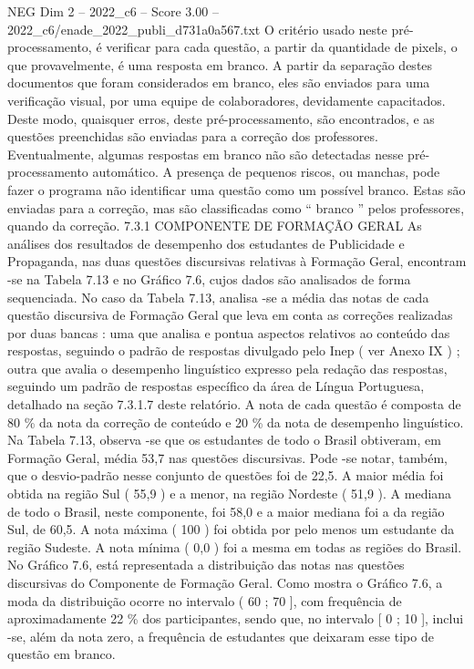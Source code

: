 \begin{textsample}{NEG Dim 2 – 2022\_c6 – Score 3.00 – 2022\_c6/enade\_2022\_publi\_d731a0a567.txt}
O critério usado neste pré-processamento, é verificar para cada questão, a partir da quantidade de pixels, o que provavelmente, é uma resposta em branco.
A partir da separação destes documentos que foram considerados em branco, eles são enviados para uma verificação visual, por uma equipe de colaboradores, devidamente capacitados.
Deste modo, quaisquer erros, deste pré-processamento, são encontrados, e as questões preenchidas são enviadas para a correção dos professores.
Eventualmente, algumas respostas em branco não são detectadas nesse pré-processamento automático.
A presença de pequenos riscos, ou manchas, pode fazer o programa não identificar uma questão como um possível branco.
Estas são enviadas para a correção, mas são classificadas como “ branco ” pelos professores, quando da correção. 7.3.1 COMPONENTE DE FORMAÇÃO GERAL As análises dos resultados de desempenho dos estudantes de Publicidade e Propaganda, nas duas questões discursivas relativas à Formação Geral, encontram -se na Tabela 7.13 e no Gráfico 7.6, cujos dados são analisados de forma sequenciada.
No caso da Tabela 7.13, analisa -se a média das notas de cada questão discursiva de Formação Geral que leva em conta as correções realizadas por duas bancas : uma que analisa e pontua aspectos relativos ao conteúdo das respostas, seguindo o padrão de respostas divulgado pelo Inep ( ver Anexo IX ) ; outra que avalia o desempenho linguístico expresso pela redação das respostas, seguindo um padrão de respostas específico da área de Língua Portuguesa, detalhado na seção 7.3.1.7 deste relatório.
A nota de cada questão é composta de 80 \% da nota da correção de conteúdo e 20 \% da nota de desempenho linguístico.
Na Tabela 7.13, observa -se que os estudantes de todo o Brasil obtiveram, em Formação Geral, média 53,7 nas questões discursivas.
Pode -se notar, também, que o desvio-padrão nesse conjunto de questões foi de 22,5.
A maior média foi obtida na região Sul ( 55,9 ) e a menor, na região Nordeste ( 51,9 ).
A mediana de todo o Brasil, neste componente, foi 58,0 e a maior mediana foi a da região Sul, de 60,5.
A nota máxima ( 100 ) foi obtida por pelo menos um estudante da região Sudeste.
A nota mínima ( 0,0 ) foi a mesma em todas as regiões do Brasil.
No Gráfico 7.6, está representada a distribuição das notas nas questões discursivas do Componente de Formação Geral.
Como mostra o Gráfico 7.6, a moda da distribuição ocorre no intervalo ( 60 ; 70 ], com frequência de aproximadamente 22 \% dos participantes, sendo que, no intervalo [ 0 ; 10 ], inclui -se, além da nota zero, a frequência de estudantes que deixaram esse tipo de questão em branco.

\end{textsample}
